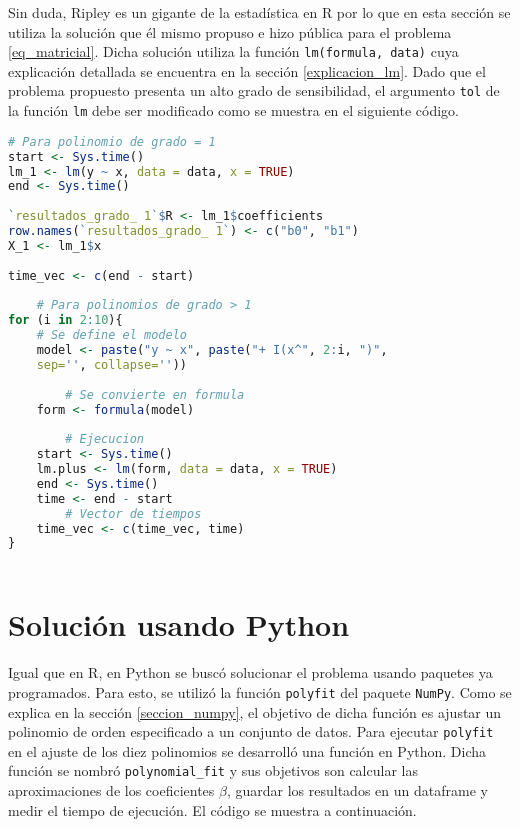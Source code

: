 Sin duda, Ripley es un gigante de la estadística en \textsf{R} por lo que en esta sección se utiliza la solución que él mismo propuso e hizo pública para el problema \ref{eq_matricial}. Dicha solución utiliza la función \texttt{lm(formula, data)} cuya explicación detallada se encuentra en la sección \ref{explicacion_lm}. Dado que el problema propuesto presenta un alto grado de sensibilidad, el argumento \texttt{tol} de la función \texttt{lm} debe ser modificado como se muestra en el siguiente código. 


\begin{lstlisting}[language=R]
	# Para polinomio de grado = 1
start <- Sys.time()
lm_1 <- lm(y ~ x, data = data, x = TRUE)
end <- Sys.time()
	
`resultados_grado_ 1`$R <- lm_1$coefficients
row.names(`resultados_grado_ 1`) <- c("b0", "b1")
X_1 <- lm_1$x
	
time_vec <- c(end - start)
	
	# Para polinomios de grado > 1
for (i in 2:10){
	# Se define el modelo
	model <- paste("y ~ x", paste("+ I(x^", 2:i, ")", 
	sep='', collapse=''))
		
		# Se convierte en formula
	form <- formula(model)
		
		# Ejecucion
	start <- Sys.time()
	lm.plus <- lm(form, data = data, x = TRUE)
	end <- Sys.time()
	time <- end - start
		# Vector de tiempos
	time_vec <- c(time_vec, time)
}
		
	\end{lstlisting}

\section{Solución usando Python}

Igual que en \textsf{R}, en \textsf{Python} se buscó solucionar el problema usando paquetes ya programados. Para esto, se utilizó la función \texttt{polyfit} del paquete \texttt{NumPy}. Como se explica en la sección \ref{seccion_numpy}, el objetivo de dicha función es ajustar un polinomio de orden especificado a un conjunto de datos. Para ejecutar \texttt{polyfit} en el ajuste de los diez polinomios se desarrolló una función en \textsf{Python}. Dicha función se nombró \texttt{polynomial\_fit} y sus objetivos son calcular las aproximaciones de los coeficientes $\beta$, guardar los resultados en un dataframe y medir el tiempo de ejecución. El código se muestra a continuación. 


